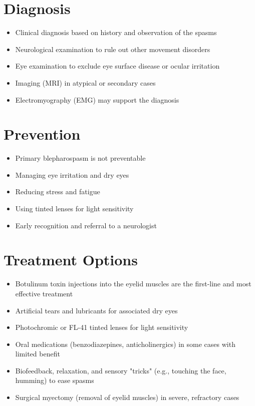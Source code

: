 \section{Diagnosis}
\begin{itemize}[noitemsep]
  \item Clinical diagnosis based on history and observation of the spasms
  \item Neurological examination to rule out other movement disorders
  \item Eye examination to exclude eye surface disease or ocular irritation
  \item Imaging (MRI) in atypical or secondary cases
  \item Electromyography (EMG) may support the diagnosis
\end{itemize}
\section{Prevention}
\begin{itemize}[noitemsep]
  \item Primary blepharospasm is not preventable
  \item Managing eye irritation and dry eyes
  \item Reducing stress and fatigue
  \item Using tinted lenses for light sensitivity
  \item Early recognition and referral to a neurologist
\end{itemize}
\section{Treatment Options}
\begin{itemize}[noitemsep]
  \item Botulinum toxin injections into the eyelid muscles are the first-line and most effective treatment
  \item Artificial tears and lubricants for associated dry eyes
  \item Photochromic or FL-41 tinted lenses for light sensitivity
  \item Oral medications (benzodiazepines, anticholinergics) in some cases with limited benefit
  \item Biofeedback, relaxation, and sensory "tricks" (e.g., touching the face, humming) to ease spasms
  \item Surgical myectomy (removal of eyelid muscles) in severe, refractory cases
\end{itemize}
